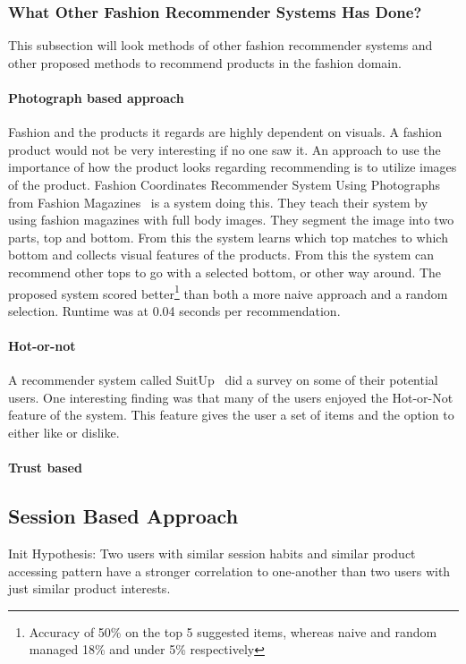 \subsubsection{What Other Fashion Recommender Systems Has Done?}
This subsection will look methods of other fashion recommender systems and other proposed methods to recommend products in the fashion domain.

\paragraph{Photograph based approach}
Fashion and the products it regards are highly dependent on visuals.
A fashion product would not be very interesting if no one saw it.
An approach to use the importance of how the product looks regarding recommending is to utilize images of the product.
Fashion Coordinates Recommender System Using Photographs from Fashion Magazines~\cite{Iwata:2011} is a system doing this.
They teach their system by using fashion magazines with full body images.
They segment the image into two parts, top and bottom.
From this the system learns which top matches to which bottom and collects visual features of the products.
From this the system can recommend other tops to go with a selected bottom, or other way around.
The proposed system scored better\footnote{Accuracy of 50\% on the top 5 suggested items, whereas naive and random managed 18\% and under 5\% respectively} than both a more naive approach and a random selection.
Runtime was at 0.04 seconds per recommendation.

\paragraph{Hot-or-not}
A recommender system called SuitUp~\cite{SuitUp} did a survey on some of their potential users.
One interesting finding was that many of the users enjoyed the Hot-or-Not feature of the system.
This feature gives the user a set of items and the option to either like or dislike.

\paragraph{Trust based}



\subsection{Session Based Approach}
Init Hypothesis:
Two users with similar session habits and similar product accessing pattern
have a stronger correlation to one-another than two users with just similar
product interests.



